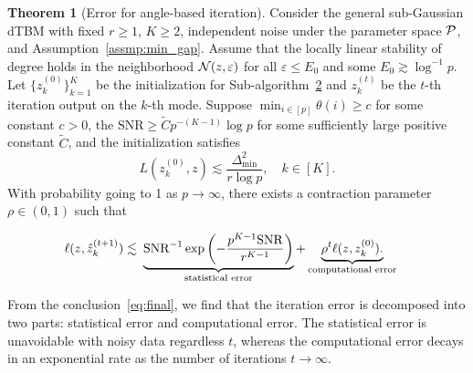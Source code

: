 \documentclass[journal]{IEEEtran}
\theoremstyle{definition}
\newtheorem{thm}{Theorem}
\theoremstyle{definition}
\newcommand{\of}[1]{\left(#1\right)}
\newcommand*{\KeepStyleUnderBrace}[1]{%
  \mathop{%
    \mathchoice
    {\underbrace{\displaystyle#1}}%
    {\underbrace{\textstyle#1}}%
    {\underbrace{\scriptstyle#1}}%
    {\underbrace{\scriptscriptstyle#1}}%
  }\limits
}
\begin{document}
\begin{thm}[Error for angle-based iteration]\label{thm:refinement} Consider the general sub-Gaussian dTBM with {fixed $r \geq 1$, $K \geq 2$}, independent noise under the parameter space $\mathcal{P}$, and Assumption~\ref{assmp:min_gap}. {Assume that the locally linear stability of degree holds in the neighborhood $\mathcal{N}(z,\varepsilon)$ for all $\varepsilon \leq E_0$ and some $E_0 \gtrsim \log^{-1}p $.}
Let $\{z^{(0)}_k\}_{k=1}^K$ be the initialization for Sub-algorithm~\hyperref[alg:main]{2} and $z^{(t)}_k$ be the $t$-th iteration output on the $k$-th mode. Suppose $\min_{i \in [p]}\theta(i) \geq c $ for some {constant} $c > 0$, the $\text{SNR} \geq \tilde C p^{-(K-1)}\log p$ for some sufficiently large positive constant $\tilde C$, and the initialization satisfies 
\begin{equation}
    L(z^{(0)}_k, z) \lesssim \frac{\Delta_{\min}^2}{r \log p}, \quad k \in [K].
\end{equation}
 With probability going to 1 {as $p \rightarrow \infty$}, there exists a contraction parameter $\rho \in (0,1)$ such that 

 \vspace{-0.5cm}
 \small
\begin{align}\label{eq:final}
    \ell(z, \hat z^{(t+1)}_k) \lesssim &\ \KeepStyleUnderBrace{
   \text{SNR}^{-1}
    \exp\of{- \frac{p^{K-1}\text{SNR}}{r^{K-1}}}}_{\substack{\text{statistical error}} }+ \KeepStyleUnderBrace{ \rho^t \ell(z, z^{(0)}_k). }_{\substack{\text{computational error}}}
\end{align}
\normalsize
\end{thm}
From the conclusion~\eqref{eq:final}, we find that the iteration error is decomposed into two parts: statistical error and computational error. The statistical error is unavoidable with noisy data regardless $t$, whereas the computational error decays in an exponential rate as the number of iterations $t \rightarrow \infty$. 
\end{document}

